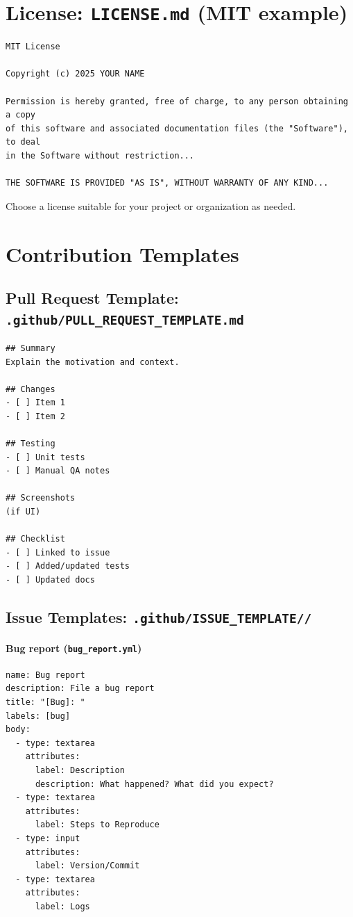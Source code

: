 \documentclass[11pt]{article}
\newcommand{\file}[1]{\texttt{#1}}
\newcommand{\dir}[1]{\texttt{#1/}}
\begin{document}
\section{License: \file{LICENSE.md} (MIT example)}
\begin{verbatim}
MIT License

Copyright (c) 2025 YOUR NAME

Permission is hereby granted, free of charge, to any person obtaining a copy
of this software and associated documentation files (the "Software"), to deal
in the Software without restriction...

THE SOFTWARE IS PROVIDED "AS IS", WITHOUT WARRANTY OF ANY KIND...
\end{verbatim}

Choose a license suitable for your project or organization as needed.

\section{Contribution Templates}
\subsection{Pull Request Template: \file{.github/PULL\_REQUEST\_TEMPLATE.md}}
\begin{verbatim}
## Summary
Explain the motivation and context.

## Changes
- [ ] Item 1
- [ ] Item 2

## Testing
- [ ] Unit tests
- [ ] Manual QA notes

## Screenshots
(if UI)

## Checklist
- [ ] Linked to issue
- [ ] Added/updated tests
- [ ] Updated docs
\end{verbatim}
\clearpage

\subsection{Issue Templates: \dir{.github/ISSUE\_TEMPLATE/}}
\paragraph{Bug report (\file{bug\_report.yml})}
\begin{verbatim}
name: Bug report
description: File a bug report
title: "[Bug]: "
labels: [bug]
body:
  - type: textarea
    attributes:
      label: Description
      description: What happened? What did you expect?
  - type: textarea
    attributes:
      label: Steps to Reproduce
  - type: input
    attributes:
      label: Version/Commit
  - type: textarea
    attributes:
      label: Logs
\end{verbatim}
\end{document}
